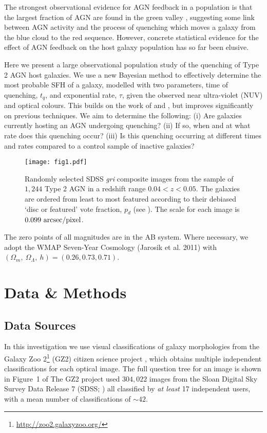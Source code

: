 \documentclass[useAMS,usenatbib]{mn2e}
\def\changed    {\color{nc} }
\begin{document}
The strongest observational evidence for AGN feedback in a population is that the largest fraction of AGN are found in the green valley \citep{CB08, Hickox09, Sch2010}, suggesting some link between AGN activity and  the process of quenching which moves a galaxy from the blue cloud to the red sequence. However, concrete statistical evidence for the effect of AGN feedback on the host galaxy population has so far been elusive.

Here we present a large observational population study of the quenching of Type 2 AGN host galaxies. 
We use a new Bayesian method \citep{Sme2015} to effectively determine the most probable SFH of a galaxy, modelled with two parameters, time of quenching, $t_q$, and exponential rate, $\tau$, given the observed near ultra-violet (NUV) and optical colours. {\changed This builds on the work of \citet{Martin07} and \citet{Sch2014}, but improves significantly on previous techniques. We} aim to determine the following: (i) Are galaxies currently hosting an AGN undergoing quenching? (ii) If so, when and at what rate does this quenching occur? (iii) Is this quenching occurring at different times and rates compared to a control sample of inactive galaxies?

\begin{figure*}
\texttt{[image: fig1.pdf]}
\caption{Randomly selected SDSS \emph{gri} composite images from the sample of $1,244$ Type 2 AGN in a redshift range $0.04 < z < 0.05$.  The galaxies are ordered from least to most featured according to their debiased `disc or featured' vote fraction, $p_d$ (see \citealt{GZ2}). The scale for each image is $0.099~\rm{arcsec/pixel}$.}
\label{mosaic}
\end{figure*}

The zero points of all magnitudes are in the AB system. Where necessary, we adopt the WMAP Seven-Year Cosmology (Jarosik et al. 2011) with $(\Omega_m , ~\Omega_\Lambda , ~h) = (0.26, 0.73, 0.71)$.



\section{Data \& Methods}

\subsection{Data Sources}\label{datasource}
In this investigation we use visual classifications of galaxy morphologies from the Galaxy Zoo 2\footnote{\url{http://zoo2.galaxyzoo.org/}} (GZ2) citizen science project \citep{GZ2}, which obtains multiple independent classifications for each optical image. The full question tree for an image is shown in Figure~1 of \citeauthor{GZ2}  The GZ2 project used $304, 022$ images from the Sloan Digital Sky Survey Data Release 7 (SDSS; \citealt{York2000, Abazajian09}) all classified by \emph{at least} 17 independent users, with a mean number of classifications of $\sim42$.
\end{document}
